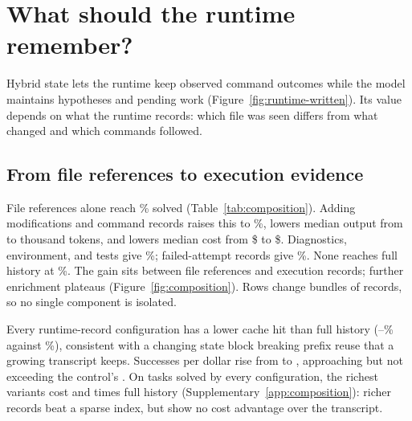 \section{What should the runtime remember?}
\label{sec:runtime}

Hybrid state lets the runtime keep observed command outcomes while the
model maintains hypotheses and pending work
(Figure~\ref{fig:runtime-written}). Its value depends on what the runtime
records: which file was seen differs from what changed and which commands
followed.



\subsection{From file references to execution evidence}

File references alone reach \ExploreFilesRate\% solved
(Table~\ref{tab:composition}). Adding modifications and command records
raises this to \ExploreCommandsRate\%, lowers median output from
\ExploreFilesOutputMedian{} to \ExploreCommandsOutputMedian{} thousand
tokens, and lowers median cost from \$\ExploreFilesCostMedian{} to
\$\ExploreCommandsCostMedian{}. Diagnostics, environment, and tests give
\ExploreRichRate\%; failed-attempt records give \ExploreFailuresRate\%.
None reaches full history at \ExploreControlRate\%. The gain sits between
file references and execution records; further enrichment plateaus
(Figure~\ref{fig:composition}). Rows change bundles of records, so no
single component is isolated.

\begin{table}[htbp]
\centering\small
\caption{Runtime-record contents under the same semantic schema
(exploratory, one repetition). Top: quality panel over all retained
outcomes. Bottom: resource panel, per-execution medians. Rows beginning
with $+$ add to the preceding row.}
\label{tab:composition}
\resizebox{\linewidth}{!}{}

\medskip
\resizebox{\linewidth}{!}{}
\end{table}



Every runtime-record configuration has a lower cache hit than full history
(\ExploreCommandsCacheHitMedian--\ExploreFilesCacheHitMedian\% against
\ExploreControlCacheHitMedian\%), consistent with a changing state block
breaking prefix reuse that a growing transcript keeps. Successes per dollar rise
from \ExploreFilesSolvedPerDollar{} to \ExploreCommandsSolvedPerDollar{},
approaching but not exceeding the control's
\ExploreControlSolvedPerDollar{}. On tasks solved by every configuration,
the richest variants cost \ExploreRichFixedCostRatio{} and
\ExploreFailuresFixedCostRatio{} times full history
(Supplementary~\ref{app:composition}): richer records beat a sparse index,
but show no cost advantage over the transcript.

